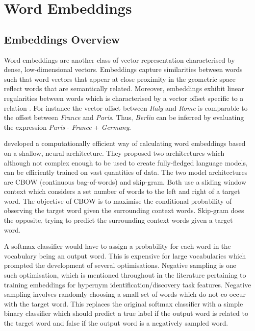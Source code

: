 \section{Word Embeddings}
\subsection{Embeddings Overview}
Word embeddings are another class of vector representation characterised by dense, low-dimensional vectors.  Embeddings capture similarities between words such that word vectors that appear at close proximity in the geometric space reflect words that are semantically related.  Moreover, embeddings exhibit linear regularities between words which is characterised by a vector offset specific to a relation \citep{mikolov2013linguistic}.  For instance the vector offset between \textit{Italy} and \textit{Rome} is comparable to the offset between \textit{France} and \textit{Paris}.  Thus, \textit{Berlin} can be inferred by evaluating the expression \textit{Paris} - \textit{France} + \textit{Germany}.

\citet{mikolov2013efficient} developed a computationally efficient way of calculating word embeddings based on a shallow, neural architecture.  They proposed two architectures which although not complex enough to be used to create fully-fledged language models, can be efficiently trained on vast quantities of data.  The two model architectures are CBOW (continuous bag-of-words) and skip-gram.  Both use a sliding window context which considers a set number of words to the left and right of a target word.  The objective of CBOW is to maximise the conditional probability of observing the target word given the surrounding context words.  Skip-gram does the opposite, trying to predict the surrounding context words given a target word.

A softmax classifier would have to assign a probability for each word in the vocabulary being an output word.  This is expensive for large vocabularies which prompted the development of several optimisations.  Negative sampling is one such optimisation, which is mentioned throughout in the literature pertaining to training embeddings for hypernym identification/discovery task features.  Negative sampling involves randomly choosing a small set of words which do not co-occur with the target word.  This replaces the original softmax classifier with a simple binary classifier which should predict a true label if the output word is related to the target word and false if the output word is a negatively sampled word.    

